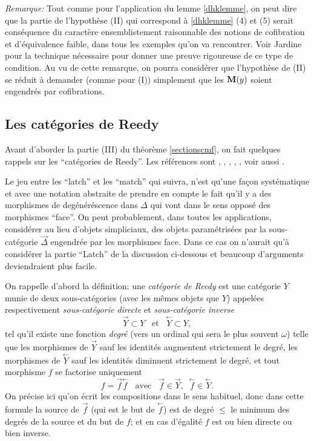 \documentclass[12pt]{article}
\newcommand{\subnumero}[1]{\subsection*{#1}\phantomsection\addcontentsline{toc}{subsection}{#1}}
\newcommand{\mm}{{\bf M}}
\newcommand{\direct}[1]{\stackrel{\rightarrow}{#1}}
\newcommand{\inverse}[1]{\stackrel{\leftarrow}{#1}}
\begin{document}
{\em Remarque:} Tout comme pour l'application du lemme \ref{dhklemme}, on
peut dire que la partie
de l'hypoth\`ese (II) qui correspond \`a \ref{dhklemme} (4) et (5) serait
cons\'equence du
caract\`ere ensemblistement raisonnable des notions de cofibration et
d'\'equivalence faible,
dans tous les exemples qu'on va rencontrer. Voir Jardine \cite{Jardine} pour la
technique n\'ecessaire pour
donner une preuve rigoureuse de ce type de condition. Au vu de cette
remarque, on pourra
consid\'erer que l'hypoth\`ese de (II) se r\'eduit \`a demander (comme pour
(I)) simplement que les
$\mm (y)$ soient engendr\'es par cofibrations.

\subnumero{Les cat\'egories de Reedy}


Avant d'aborder la partie (III) du th\'eor\`eme \ref{sectionscmf},
on fait quelques rappels sur les ``cat\'egories de Reedy''. Les
r\'ef\'erences sont
\cite{Reedy}, \cite{BousfieldKan}, \cite{Hirschhorn}, \cite{DHK},
\cite{JardineGoerssBook}, voir aussi \cite{DwyerKan3}.

Le jeu entre les ``latch'' et les ``match'' qui suivra, n'est qu'une fa\c{c}on
syst\'ematique et avec une notation abstraite de prendre en compte le fait
qu'il y a des morphismes de deg\'en\'er\'escence dans $\Delta$ qui vont dans le
sens oppos\'e des morphismes ``face''. On peut probablement, dans toutes les
applications, consid\'erer au lieu d'objets simpliciaux, des objets
param\'etris\'ees par la sous-cat\'egorie $\direct{\Delta}$ engendr\'ee par les
morphismes face. Dans ce cas on n'aurait qu'\`a consid\'erer la partie
``Latch'' de la discussion ci-dessous et beaucoup d'arguments deviendraient
plus facile.


On rappelle d'abord la d\'efinition: une {\em cat\'egorie de Reedy}
est une cat\'egorie $Y$ munie de deux sous-cat\'egories (avec les m\^emes objets
que $Y$) appel\'ees respectivement {\em sous-cat\'egorie directe} et {\em
sous-cat\'egorie inverse}
$$
\direct{Y}\subset Y \;\;\; \mbox{et} \;\;\; \inverse{Y}\subset Y,
$$
tel qu'il existe une fonction {\em degr\'e} (vers un ordinal qui sera le plus
souvent $\omega$)  telle que les morphismes de $\direct{Y}$ sauf les
identit\'es augmentent strictement le degr\'e, les morphismes de $\inverse{Y}$
sauf les identit\'es diminuent strictement le degr\'e, et tout morphisme $f$ se
factorise uniquement
$$
f= \direct{f}\inverse{f} \;\;\; \mbox{avec} \;\;\; \direct{f}\in \direct{Y},
\;\; \inverse{f}\in \inverse{Y}.
$$
On pr\'ecise ici qu'on \'ecrit les compositions dans le sens habituel, donc
dans cette formule la source de $\direct{f}$ (qui est le but de
$\inverse{f}$) est de degr\'e $\leq$ le minimum des degr\'es de la source et du
but de $f$; et en cas d'\'egalit\'e $f$ est ou bien directe ou bien inverse.
\end{document}
